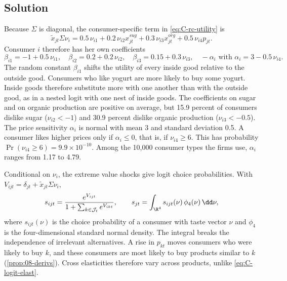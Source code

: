 \subsection{Solution}

Because $\Sigma$ is diagonal, the consumer-specific term in \eqref{eq:C-rc-utility} is
\begin{equation*}
  \tilde x_{jt}\Sigma\nu_i = 0.5\,\nu_{i1} + 0.2\,\nu_{i2}x^{sug}_{jt} + 0.3\,\nu_{i3}x^{org}_{jt} + 0.5\,\nu_{i4}p_{jt} .
\end{equation*}
Consumer $i$ therefore has her own coefficients
\begin{equation}\label{eq:C-rc-coefs}
  \beta_{i1} = -1 + 0.5\,\nu_{i1} , \quad \beta_{i2} = 0.2 + 0.2\,\nu_{i2} , \quad
  \beta_{i3} = 0.15 + 0.3\,\nu_{i3} , \quad -\alpha_i \text{ with } \alpha_i = 3 - 0.5\,\nu_{i4} .
\end{equation}
The random constant $\beta_{i1}$ shifts the utility of every inside good relative to the outside good. Consumers
who like yogurt are more likely to buy some yogurt. Inside goods therefore substitute more with one another than
with the outside good, as in a nested logit with one nest of inside goods. The coefficients on sugar and on organic
production are positive on average, but 15.9 percent of consumers dislike sugar ($\nu_{i2} < -1$) and 30.9 percent
dislike organic production ($\nu_{i3} < -0.5$). The price sensitivity $\alpha_i$ is normal with mean 3 and standard
deviation 0.5. A consumer likes higher prices only if $\alpha_i \le 0$, that is, if $\nu_{i4} \ge 6$. This has
probability $\Pr(\nu_{i4} \ge 6) = 9.9\times10^{-10}$. Among the 10,000 consumer types the firms use, $\alpha_i$
ranges from 1.17 to 4.79.

Conditional on $\nu_i$, the extreme value shocks give logit choice probabilities. With
$V_{ijt} = \delta_{jt} + \tilde x_{jt}\Sigma\nu_i$,
\begin{equation}\label{eq:C-rc-sij}
  s_{ijt} = \frac{e^{V_{ijt}}}{1 + \sum_{k \in \mathcal{J}_t}e^{V_{ikt}}} , \qquad
  s_{jt} = \int_{\R^4} s_{ijt}(\nu)\,\phi_4(\nu)\,\dd\nu ,
\end{equation}
where $s_{ijt}(\nu)$ is the choice probability of a consumer with taste vector $\nu$ and $\phi_4$ is the
four-dimensional standard normal density. The integral breaks the
independence of irrelevant alternatives. A rise in $p_{kt}$ moves consumers who were likely to buy $k$, and these
consumers are most likely to buy products similar to $k$ (\cref{prop:08-derivs}). Cross elasticities therefore vary
across products, unlike \eqref{eq:C-logit-elast}.

